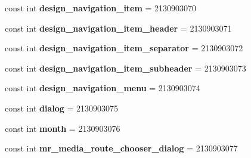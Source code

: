 \begin{DoxyCompactItemize}
\item 
\hypertarget{classClient_1_1Droid_1_1Resource_1_1Layout_a8fe1b9e8d16bddaa37cbd7459022c650}{}const int {\bfseries design\+\_\+navigation\+\_\+item} = 2130903070\label{classClient_1_1Droid_1_1Resource_1_1Layout_a8fe1b9e8d16bddaa37cbd7459022c650}

\item 
\hypertarget{classClient_1_1Droid_1_1Resource_1_1Layout_a148092061fe9c8c0d904e553824c8fd9}{}const int {\bfseries design\+\_\+navigation\+\_\+item\+\_\+header} = 2130903071\label{classClient_1_1Droid_1_1Resource_1_1Layout_a148092061fe9c8c0d904e553824c8fd9}

\item 
\hypertarget{classClient_1_1Droid_1_1Resource_1_1Layout_a194deaea106140ad64a80a1e4b8a754c}{}const int {\bfseries design\+\_\+navigation\+\_\+item\+\_\+separator} = 2130903072\label{classClient_1_1Droid_1_1Resource_1_1Layout_a194deaea106140ad64a80a1e4b8a754c}

\item 
\hypertarget{classClient_1_1Droid_1_1Resource_1_1Layout_aee09ccf6263d754d9b3c280e40b02499}{}const int {\bfseries design\+\_\+navigation\+\_\+item\+\_\+subheader} = 2130903073\label{classClient_1_1Droid_1_1Resource_1_1Layout_aee09ccf6263d754d9b3c280e40b02499}

\item 
\hypertarget{classClient_1_1Droid_1_1Resource_1_1Layout_ab96224953beb605ca995ac801236bac6}{}const int {\bfseries design\+\_\+navigation\+\_\+menu} = 2130903074\label{classClient_1_1Droid_1_1Resource_1_1Layout_ab96224953beb605ca995ac801236bac6}

\item 
\hypertarget{classClient_1_1Droid_1_1Resource_1_1Layout_ad50921ba2f055d02b8efcb82a27d7405}{}const int {\bfseries dialog} = 2130903075\label{classClient_1_1Droid_1_1Resource_1_1Layout_ad50921ba2f055d02b8efcb82a27d7405}

\item 
\hypertarget{classClient_1_1Droid_1_1Resource_1_1Layout_aeb01ac946a2a777820d0985bdebd9eca}{}const int {\bfseries month} = 2130903076\label{classClient_1_1Droid_1_1Resource_1_1Layout_aeb01ac946a2a777820d0985bdebd9eca}

\item 
\hypertarget{classClient_1_1Droid_1_1Resource_1_1Layout_aed0faf7ac4ca738b9f78fd2339df88a7}{}const int {\bfseries mr\+\_\+media\+\_\+route\+\_\+chooser\+\_\+dialog} = 2130903077\label{classClient_1_1Droid_1_1Resource_1_1Layout_aed0faf7ac4ca738b9f78fd2339df88a7}


\end{DoxyCompactItemize}
